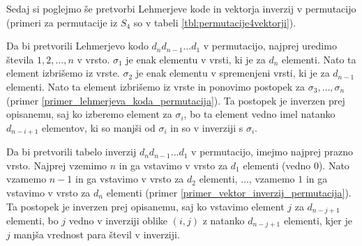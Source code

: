 \documentclass[a4paper, 12pt]{book}
\begin{document}
Sedaj si poglejmo še pretvorbi Lehmerjeve kode in vektorja inverzij v permutacijo (primeri za permutacije iz $S_4$ so v tabeli \ref{tbl:permutacije4vektorji}).

Da bi pretvorili Lehmerjevo kodo $d_nd_{n-1}...d_1$ v permutacijo, najprej uredimo števila $1, 2, \dots, n$ v vrsto. $\sigma_1$ je enak elementu v vrsti, ki je za $d_{n}$ elementi. Nato ta element izbrišemo iz vrste. $\sigma_2$ je enak elementu v spremenjeni vrsti, ki je za $d_{n-1}$ elementi. Nato ta element izbrišemo iz vrste in ponovimo postopek za $\sigma_3, \dots, \sigma_n$ (primer \ref{primer_lehmerjeva_koda_permutacija}). Ta postopek je inverzen prej opisanemu, saj ko izberemo element za $\sigma_i$, bo ta element vedno imel natanko $d_{n-i+1}$ elementov, ki so manjši od $\sigma_i$ in so v inverziji s $\sigma_i$.

Da bi pretvorili tabelo inverzij $d_nd_{n-1}...d_1$ v permutacijo, imejmo najprej prazno vrsto. Najprej vzemimo $n$ in ga vstavimo v vrsto za $d_1$ elementi (vedno $0$). Nato vzamemo $n-1$ in ga vstavimo v vrsto za $d_{2}$ elementi, $\dots$, vzamemo $1$ in ga vstavimo v vrsto za $d_{n}$ elementi (primer \ref{primer_vektor_inverzij_permutacija}). Ta postopek je inverzen prej opisanemu, saj ko vstavimo element $j$ za $d_{n-j+1}$ elementi, bo $j$ vedno v inverziji oblike $(i, j)$ z natanko $d_{n-j+1}$ elementi, kjer je $j$ manjša vrednost para števil v inverziji.
\end{document}
